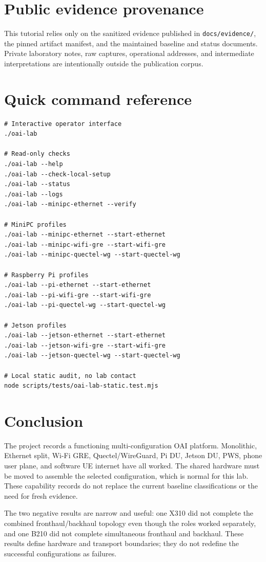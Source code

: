 \documentclass[11pt,a4paper]{article}
\begin{document}
\section{Public evidence provenance}

This tutorial relies only on the sanitized evidence published in
\texttt{docs/evidence/}, the pinned artifact manifest, and the maintained
baseline and status documents. Private laboratory notes, raw captures,
operational addresses, and intermediate interpretations are intentionally
outside the publication corpus.

\section{Quick command reference}

\begin{lstlisting}
# Interactive operator interface
./oai-lab

# Read-only checks
./oai-lab --help
./oai-lab --check-local-setup
./oai-lab --status
./oai-lab --logs
./oai-lab --minipc-ethernet --verify

# MiniPC profiles
./oai-lab --minipc-ethernet --start-ethernet
./oai-lab --minipc-wifi-gre --start-wifi-gre
./oai-lab --minipc-quectel-wg --start-quectel-wg

# Raspberry Pi profiles
./oai-lab --pi-ethernet --start-ethernet
./oai-lab --pi-wifi-gre --start-wifi-gre
./oai-lab --pi-quectel-wg --start-quectel-wg

# Jetson profiles
./oai-lab --jetson-ethernet --start-ethernet
./oai-lab --jetson-wifi-gre --start-wifi-gre
./oai-lab --jetson-quectel-wg --start-quectel-wg

# Local static audit, no lab contact
node scripts/tests/oai-lab-static.test.mjs
\end{lstlisting}

\section{Conclusion}

The project records a functioning multi-configuration OAI platform.
Monolithic, Ethernet split, Wi-Fi GRE, Quectel/WireGuard, Pi DU, Jetson DU,
PWS, phone user plane, and software UE internet have all worked. The shared
hardware must be moved to assemble the selected configuration, which is normal
for this lab. These capability records do not replace the current baseline
classifications or the need for fresh evidence.

The two negative results are narrow and useful: one X310 did not complete the
combined fronthaul/backhaul topology even though the roles worked separately,
and one B210 did not complete simultaneous fronthaul and backhaul. These results
define hardware and transport boundaries; they do not redefine the successful
configurations as failures.
\end{document}
